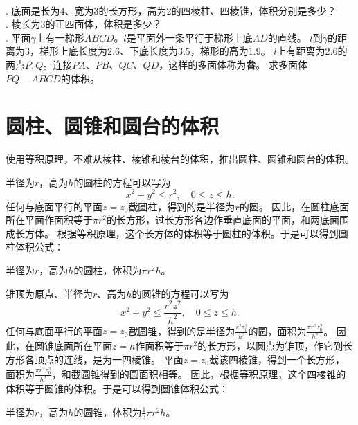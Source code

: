\documentclass[12pt,UTF8]{ctexbook}
\begin{document}
\begin{xt}
    \mbox{}\\
    . 底面是长为$4$、宽为$3$的长方形，高为$2$的四棱柱、四棱锥，体积分别是多少？\\
    . 棱长为$3$的正四面体，体积是多少？\\
    . 平面$\gamma$上有一梯形$ABCD$。$l$是平面外一条平行于梯形上底$AD$的直线。
    $l$到$\gamma$的距离为$3$，梯形上底长度为$2.6$、下底长度为$3.5$，梯形的高为$1.9$。
    $l$上有距离为$2.6$的两点$P,Q$。连接$PA$、$PB$、$QC$、$QD$，这样的多面体称为\textbf{畚}。
    求多面体$PQ-ABCD$的体积。
\end{xt}

\section{圆柱、圆锥和圆台的体积}
使用等积原理，不难从棱柱、棱锥和棱台的体积，推出圆柱、圆锥和圆台的体积。

半径为$r$，高为$h$的圆柱的方程可以写为
$$ x^2 + y^2 \leqslant r^2 , \quad 0\leqslant z \leqslant h.$$
任何与底面平行的平面$z=z_0$截圆柱，得到的是半径为$r$的圆。
因此，在圆柱底面所在平面作面积等于$\pi r^2$的长方形，过长方形各边作垂直底面的平面，和两底面围成长方体。
根据等积原理，这个长方体的体积等于圆柱的体积。于是可以得到圆柱体积公式：
\begin{tm}\label{tm:3-3-0}
    半径为$r$，高为$h$的圆柱，体积为$\pi r^2h$。
\end{tm}

锥顶为原点、半径为$r$、高为$h$的圆锥的方程可以写为
$$ x^2 + y^2 \leqslant \frac{r^2z^2}{h^2} , \quad 0\leqslant z \leqslant h.$$
任何与底面平行的平面$z=z_0$截圆锥，得到的是半径为$\frac{r^2z_0^2}{h^2}$的圆，面积为$\frac{\pi r^2z_0^2}{h^2}$。
因此，在圆锥底面所在平面$z=h$作面积等于$\pi r^2$的长方形，以圆点为锥顶，作它到长方形各顶点的连线，是为一四棱锥。
平面$z=z_0$截该四棱锥，得到一个长方形，面积为$\frac{\pi r^2z_0^2}{h^2}$，和截圆锥得到的圆面积相等。
因此，根据等积原理，这个四棱锥的体积等于圆锥的体积。于是可以得到圆锥体积公式：
\begin{tm}\label{tm:3-3-10}
    半径为$r$，高为$h$的圆锥，体积为$\frac{1}{3}\pi r^2h$。
\end{tm}
\end{document}
